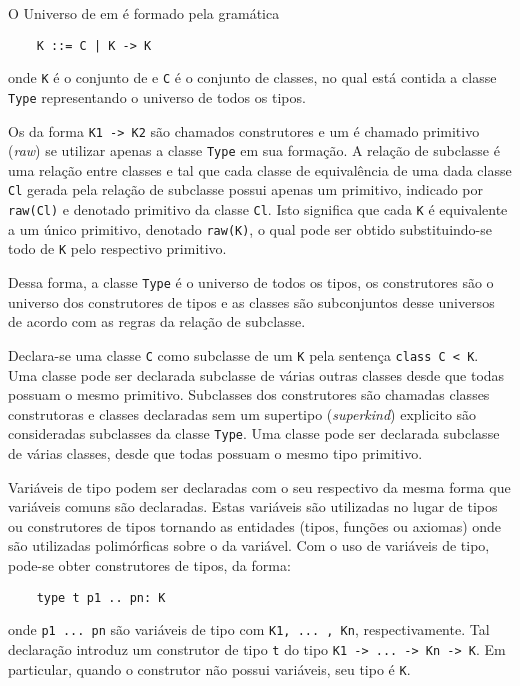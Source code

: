 O Universo de \kinds em \HasCASL é formado pela gramática
\begin{Verbatim}
	K ::= C | K -> K
\end{Verbatim}
onde \Verb.K. é o conjunto de \kinds e \Verb.C. é o conjunto de classes, no qual está contida a classe \Verb.Type. representando o universo de todos os tipos.

Os \kinds da forma \Verb.K1 -> K2. são chamados \kinds construtores e um \kind é chamado primitivo (\textit{raw}) se utilizar apenas a classe \Verb.Type. em sua formação.
A relação de subclasse é uma relação entre classes e \kinds tal que cada classe de equivalência de uma dada classe \Verb.Cl. gerada pela relação de subclasse possui apenas um \kind primitivo, indicado por \Verb.raw(Cl). e denotado \kind primitivo da classe \Verb.Cl..
Isto significa que cada \kind \Verb.K. é equivalente a um único \kind primitivo, denotado \Verb.raw(K)., o qual pode ser obtido substituindo-se todo \kind de \Verb.K. pelo respectivo \kind primitivo.

Dessa forma, a classe \Verb.Type. é o universo de todos os tipos, os \kinds construtores são o universo dos construtores de tipos e as classes são subconjuntos desse universos de acordo com as regras da relação de subclasse.

Declara-se uma classe \Verb.C. como subclasse de um \kind \Verb.K. pela sentença \Verb.class C < K..
Uma classe pode ser declarada subclasse de várias outras classes desde que todas possuam o mesmo \kind primitivo.
Subclasses dos \kinds construtores são chamadas classes construtoras e classes declaradas sem um supertipo (\textit{superkind}) explicito são consideradas subclasses da classe \Verb.Type..
Uma classe pode ser declarada subclasse de várias classes, desde que todas possuam o mesmo tipo primitivo.

Variáveis de tipo podem ser declaradas com o seu respectivo \kind da mesma forma que variáveis comuns são declaradas.
Estas variáveis são utilizadas no lugar de tipos ou construtores de tipos tornando as entidades (tipos, funções ou axiomas) onde são utilizadas polimórficas sobre o \kind da variável.
Com o uso de variáveis de tipo, pode-se obter construtores de tipos, da forma:
\begin{Verbatim}
	type t p1 .. pn: K
\end{Verbatim}
onde \Verb_p1 ... pn_ são variáveis de tipo com \kinds \Verb_K1, ... , Kn_, respectivamente.
Tal declaração introduz um construtor de tipo \Verb.t. do tipo \Verb_K1 -> ... -> Kn -> K_.
Em particular, quando o construtor não possui variáveis, seu tipo é \Verb.K..

